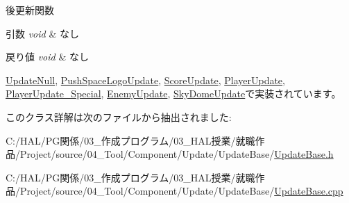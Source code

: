 後更新関数 


\begin{DoxyParams}{引数}
{\em void} & なし \\
\hline
\end{DoxyParams}

\begin{DoxyRetVals}{戻り値}
{\em void} & なし \\
\hline
\end{DoxyRetVals}


\mbox{\hyperlink{class_update_null_a8d335882bce4eab384d44c4bae474ee5}{Update\+Null}}, \mbox{\hyperlink{class_push_space_logo_update_a4423864fb22b1211e92a4317d0b70a44}{Push\+Space\+Logo\+Update}}, \mbox{\hyperlink{class_score_update_adc9a48f54828e49c072c298777935893}{Score\+Update}}, \mbox{\hyperlink{class_player_update_ae376f517f3458edfef61ac366aa78e36}{Player\+Update}}, \mbox{\hyperlink{class_player_update___special_a1daae8fdcd87bf907313a98e022f254c}{Player\+Update\+\_\+\+Special}}, \mbox{\hyperlink{class_enemy_update_ae14e4ebb42ad9043534e53edcba5b242}{Enemy\+Update}}, \mbox{\hyperlink{class_sky_dome_update_a94347cb50b4dc13528738a7b812da261}{Sky\+Dome\+Update}}で実装されています。



このクラス詳解は次のファイルから抽出されました\+:\begin{DoxyCompactItemize}
\item 
C\+:/\+H\+A\+L/\+P\+G関係/03\+\_\+作成プログラム/03\+\_\+\+H\+A\+L授業/就職作品/\+Project/source/04\+\_\+\+Tool/\+Component/\+Update/\+Update\+Base/\mbox{\hyperlink{_update_base_8h}{Update\+Base.\+h}}\item 
C\+:/\+H\+A\+L/\+P\+G関係/03\+\_\+作成プログラム/03\+\_\+\+H\+A\+L授業/就職作品/\+Project/source/04\+\_\+\+Tool/\+Component/\+Update/\+Update\+Base/\mbox{\hyperlink{_update_base_8cpp}{Update\+Base.\+cpp}}\end{DoxyCompactItemize}
